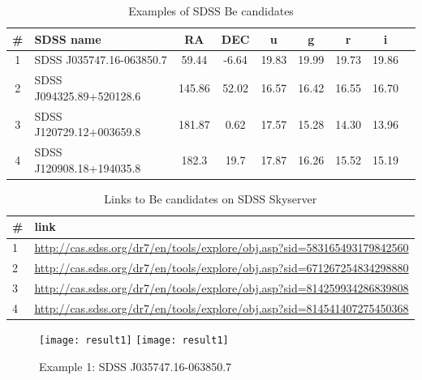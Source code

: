 
\begin{table}[ht]
  \small
     \begin{tabular}[ht]{c l c c c c c c c}
       \toprule 
     \# &SDSS name & RA & DEC & u  & g & r & i \\
   \midrule
   1&SDSS J035747.16-063850.7& 59.44 & -6.64& 19.83 &19.99& 19.73&19.86 \\ 
   2&SDSS J094325.89+520128.6& 145.86& 52.02& 16.57 &16.42& 16.55& 16.70\\ 
   3&SDSS J120729.12+003659.8& 181.87& 0.62 & 17.57 &15.28& 14.30& 13.96\\ 
   4&SDSS J120908.18+194035.8& 182.3 & 19.7 & 17.87 &16.26& 15.52& 15.19\\ 
   \bottomrule
   \end{tabular}
  \caption{Examples of SDSS Be candidates}
  \label{tab:Result}
\end{table}


\begin{table}[ht]
  \small
     \begin{tabular}[ht]{l l}
       \toprule
     \# & link \\
   \midrule
   1& \url{http://cas.sdss.org/dr7/en/tools/explore/obj.asp?sid=583165493179842560} \\   
   2& \url{http://cas.sdss.org/dr7/en/tools/explore/obj.asp?sid=671267254834298880}\\ 
   3& \url{http://cas.sdss.org/dr7/en/tools/explore/obj.asp?sid=814259934286839808}\\ 
   4& \url{http://cas.sdss.org/dr7/en/tools/explore/obj.asp?sid=814541407275450368}\\ 
   \bottomrule
   \end{tabular}
   \caption{Links to Be candidates on SDSS Skyserver}
  \label{tab:Links}
\end{table}




   \begin{figure}[!htbp]
      \begin{center}
        \leavevmode
        \ifpdf
        \texttt{[image: result1]}
        \else
        \texttt{[image: result1]}
        \fi
        \caption{Example 1: SDSS J035747.16-063850.7 }
        
        \label{FigResult1}
      \end{center}
    \end{figure}

